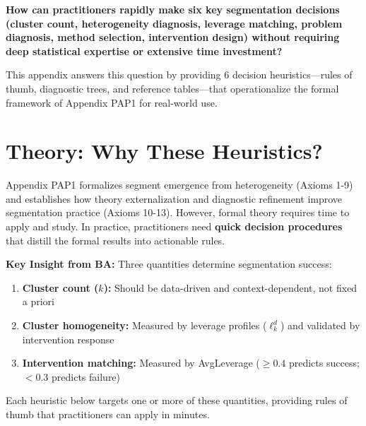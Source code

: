 \textbf{How can practitioners rapidly make six key segmentation decisions (cluster count, heterogeneity diagnosis, leverage matching, problem diagnosis, method selection, intervention design) without requiring deep statistical expertise or extensive time investment?}

This appendix answers this question by providing 6 decision heuristics---rules of thumb, diagnostic trees, and reference tables---that operationalize the formal framework of Appendix PAP1 for real-world use.

\vspace{1em}


\section{Theory: Why These Heuristics?}
\label{sec:h-theory}

Appendix PAP1 formalizes segment emergence from heterogeneity (Axioms 1-9) and establishes how theory externalization and diagnostic refinement improve segmentation practice (Axioms 10-13). However, formal theory requires time to apply and study. In practice, practitioners need \textbf{quick decision procedures} that distill the formal results into actionable rules.

\textbf{Key Insight from BA:} Three quantities determine segmentation success:

\begin{enumerate}
\item \textbf{Cluster count ($k$):} Should be data-driven and context-dependent, not fixed a priori
\item \textbf{Cluster homogeneity:} Measured by leverage profiles ($\ell_k^d$) and validated by intervention response
\item \textbf{Intervention matching:} Measured by AvgLeverage ($\geq 0.4$ predicts success; $< 0.3$ predicts failure)
\end{enumerate}

Each heuristic below targets one or more of these quantities, providing rules of thumb that practitioners can apply in minutes.

\vspace{1em}


